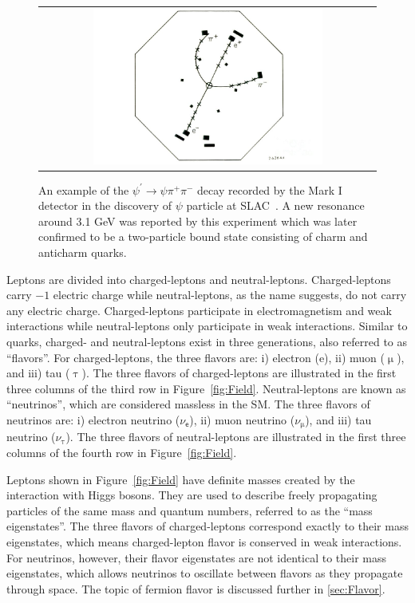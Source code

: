 \begin{figure}[tbh!]
 \begin{center}
 \begin{tabular}{c}
 \includegraphics[width=0.7\textwidth]{figures/Part1/Field/J}
 \end{tabular}
 \caption{An example of the $\psi^{\prime}\rightarrow\psi\pi^{+}\pi^{-}$ decay recorded by the Mark I detector in the discovery of $\psi$ particle at SLAC~\cite{SLAC-SP-017:1974ind}. A new resonance around 3.1 GeV was reported by this experiment which was later confirmed to be a two-particle bound state consisting of charm and anticharm quarks.}
 \label{fig:JPsi}
 \end{center}
\end{figure}

Leptons are divided into charged-leptons and neutral-leptons. Charged-leptons carry $-1$ electric charge while neutral-leptons, as the name suggests, do not carry any electric charge. Charged-leptons participate in electromagnetism and weak interactions while neutral-leptons only participate in weak interactions. Similar to quarks, charged- and neutral-leptons exist in three generations, also referred to as ``flavors''. For charged-leptons, the three flavors are: i) electron (e), ii) muon ($\upmu$), and iii) tau ($\uptau$). The three flavors of charged-leptons are illustrated in the first three columns of the third row in Figure~\ref{fig:Field}. Neutral-leptons are known as ``neutrinos'', which are considered massless in the \ac{SM}. The three flavors of neutrinos are: i) electron neutrino ($\nu_{\textsf{e}}$), ii) muon neutrino ($\nu_{\upmu}$), and iii) tau neutrino ($\nu_{\uptau}$). The three flavors of neutral-leptons are illustrated in the first three columns of the fourth row in Figure~\ref{fig:Field}.

Leptons shown in Figure~\ref{fig:Field} have definite masses created by the interaction with Higgs bosons. They are used to describe freely propagating particles of the same mass and quantum numbers, referred to as the ``mass eigenstates''. The three flavors of charged-leptons correspond exactly to their mass eigenstates, which means charged-lepton flavor is conserved in weak interactions. For neutrinos, however, their flavor eigenstates are not identical to their mass eigenstates, which allows neutrinos to oscillate between flavors as they propagate through space. The topic of fermion flavor is discussed further in \autoref{sec:Flavor}. 

